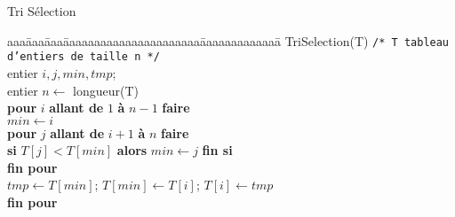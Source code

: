 \begin{frame}{Tri Sélection}
  \begin{tabbing}
    aaa\=aaa\=aaa\=aaaaaaaaaaaaaaaaaaaaaa\=aaaaaaaaaaaaa\=\kill
    TriSelection(T) \texttt{/* T tableau d'entiers de taille n */} \\
    \>  entier $i,j,min,tmp$; \\
    \> entier $n \leftarrow$ longueur(T)\\
    \> \textbf{pour} $i$ \textbf{allant de} $1$ \textbf{à} $n-1$ \textbf{faire}\\
    \> \> $min \leftarrow i$ \\
    \> \> \textbf{pour} $j$ \textbf{allant de}  $i+1$ \textbf{à} $n$ \textbf{faire}\\
    \> \> \> \textbf{si} $T[j] < T[min]$ \textbf{alors} $min \leftarrow j$ \textbf{fin si}\\
    \> \> \textbf{fin pour} \\
    \> \> $tmp \leftarrow T[min]$; $T[min] \leftarrow T[i]$; $T[i] \leftarrow tmp$ \\
    \> \textbf{fin pour} %
  \end{tabbing}

\end{frame}

%

